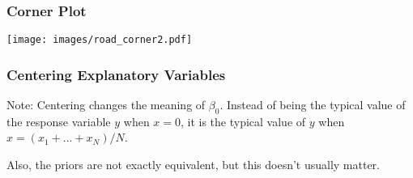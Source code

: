 \documentclass{beamer}
\begin{document}
\begin{frame}
\frametitle{Corner Plot}
\begin{center}
\texttt{[image: images/road\_corner2.pdf]}
\end{center}
\end{frame}

\begin{frame}[fragile]
\frametitle{Centering Explanatory Variables}
Note: Centering changes the meaning of $\beta_0$. Instead of being the typical
value of the response variable $y$ when $x=0$, it is the typical value of
$y$ when $x=(x_1 + ... + x_N)/N$.\pause

Also, the priors are not exactly equivalent, but this doesn't usually matter.
\end{frame}
\end{document}
